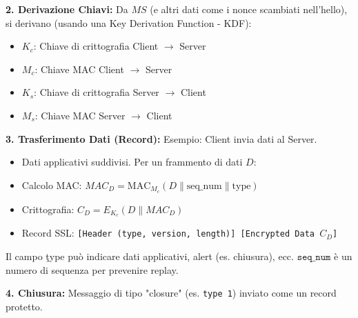 \textbf{2. Derivazione Chiavi:}
Da $MS$ (e altri dati come i nonce scambiati nell'hello), si derivano (usando una Key Derivation Function - KDF):
\begin{itemize}
    \item $K_c$: Chiave di crittografia Client $\rightarrow$ Server
    \item $M_c$: Chiave MAC Client $\rightarrow$ Server
    \item $K_s$: Chiave di crittografia Server $\rightarrow$ Client
    \item $M_s$: Chiave MAC Server $\rightarrow$ Client
\end{itemize}

\textbf{3. Trasferimento Dati (Record):}
Esempio: Client invia dati al Server.
\begin{itemize}
    \item Dati applicativi suddivisi. Per un frammento di dati $D$:
    \item Calcolo MAC: $MAC_D = \text{MAC}_{M_c}(D \| \text{seq\_num} \| \text{type})$
    \item Crittografia: $C_D = E_{K_c}(D \| MAC_D)$
    \item Record SSL: \texttt{[Header (type, version, length)] [Encrypted Data $C_D$]}
\end{itemize}
Il campo \c{type} può indicare dati applicativi, alert (es. chiusura), ecc. $\texttt{seq\_num}$ è un numero di sequenza per prevenire replay.

\textbf{4. Chiusura:}
Messaggio di tipo "closure" (es. \texttt{type 1}) inviato come un record protetto.


